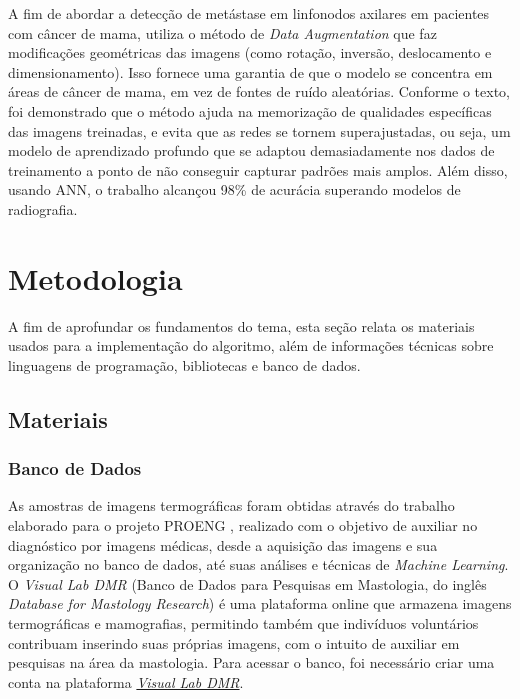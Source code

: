 A fim de abordar a detecção de metástase em linfonodos axilares em pacientes com câncer de mama,  utiliza o método de \textit{Data Augmentation} que faz modificações geométricas das imagens (como rotação, inversão, deslocamento e dimensionamento). Isso fornece uma garantia de que o modelo se concentra em áreas de câncer de mama, em vez de fontes de ruído aleatórias. Conforme o texto, foi demonstrado que o método ajuda na memorização de qualidades específicas das imagens treinadas, e evita que as redes se tornem superajustadas, ou seja, um modelo de aprendizado profundo que se adaptou demasiadamente nos dados de treinamento a ponto de não conseguir capturar padrões mais amplos. Além disso, usando ANN, o trabalho alcançou 98\% de acurácia superando modelos de radiografia.


\section{\esp Metodologia} \label{metodologia}
A fim de aprofundar os fundamentos do tema, esta seção relata os materiais usados para a implementação do algoritmo, além de informações técnicas sobre linguagens de programação, bibliotecas e banco de dados.

\subsection{\esp Materiais} \label{materiais}

\subsubsection{\esp Banco de Dados} \label{database}
As amostras de imagens termográficas foram obtidas através do trabalho elaborado para o projeto PROENG , realizado com o objetivo de auxiliar no diagnóstico por imagens médicas, desde a aquisição das imagens e sua organização no banco de dados, até suas análises e técnicas de \textit{Machine Learning}. O \textit{Visual Lab DMR} (Banco de Dados para Pesquisas em Mastologia, do inglês \textit{Database for Mastology Research}) é uma plataforma online que armazena imagens termográficas e mamografias, permitindo também que indivíduos voluntários contribuam inserindo suas próprias imagens, com o intuito de auxiliar em pesquisas na área da mastologia. Para acessar o banco, foi necessário criar uma conta na plataforma \href{http://visual.ic.uff.br/dmi}{\textit{Visual Lab DMR}}. 

